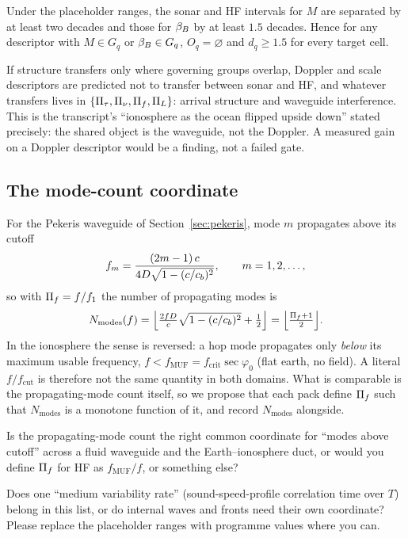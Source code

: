 \begin{proposition}
\label{prop:overlap}
Under the placeholder ranges, the sonar and HF intervals for $M$ are separated by at least two decades and those for $\beta_{B}$ by at least $1.5$ decades. Hence for any descriptor with $M\in G_q$ or $\beta_{B}\in G_q$, $O_q=\varnothing$ and $d_q\ge1.5$ for every target cell.
\end{proposition}
\begin{corollary} \tagH{}
If structure transfers only where governing groups overlap, Doppler and scale descriptors are predicted not to transfer between sonar and HF, and whatever transfers lives in $\{\Pi_{\tau},\Pi_{\nu},\Pi_{f},\Pi_{L}\}$: arrival structure and waveguide interference. This is the transcript's ``ionosphere as the ocean flipped upside down'' stated precisely: the shared object is the waveguide, not the Doppler. A measured gain on a Doppler descriptor would be a finding, not a failed gate.
\end{corollary}

\subsection{The mode-count coordinate}

For the Pekeris waveguide of Section~\ref{sec:pekeris}, mode $m$ propagates above its cutoff
\begin{equation}
  f_m = \frac{(2m-1)\,c}{4D\sqrt{1-(c/c_{b})^2}},\qquad m=1,2,\dots,
  \label{eq:cutoff}
\end{equation}
so with $\Pi_{f} = f/f_1$ the number of propagating modes is
\begin{equation}
  N_{\mathrm{modes}}(f) = \Big\lfloor \tfrac{2fD}{c}\sqrt{1-(c/c_{b})^2}+\tfrac12 \Big\rfloor = \Big\lfloor \tfrac{\Pi_{f}+1}{2} \Big\rfloor .
  \label{eq:modecount}
\end{equation}
In the ionosphere the sense is reversed: a hop mode propagates only \emph{below} its maximum usable frequency, $f<f_{\mathrm{MUF}}=f_{\mathrm{crit}}\sec\varphi_0$ (flat earth, no field). A literal $f/f_{\mathrm{cut}}$ is therefore not the same quantity in both domains. What is comparable is the propagating-mode count itself, so we propose that each pack define $\Pi_{f}$ such that $N_{\mathrm{modes}}$ is a monotone function of it, and record $N_{\mathrm{modes}}$ alongside.

\begin{question}
Is the propagating-mode count the right common coordinate for ``modes above cutoff'' across a fluid waveguide and the Earth--ionosphere duct, or would you define $\Pi_{f}$ for HF as $f_{\mathrm{MUF}}/f$, or something else?
\end{question}
\begin{question}
Does one ``medium variability rate'' (sound-speed-profile correlation time over $T$) belong in this list, or do internal waves and fronts need their own coordinate? Please replace the placeholder ranges with programme values where you can.
\end{question}


